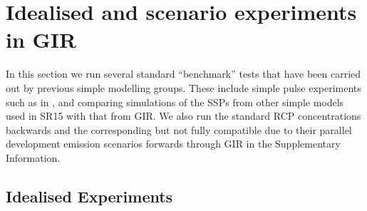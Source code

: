 \documentclass[gmd, manuscript]{copernicus}
\begin{document}
\section{Idealised and scenario experiments in GIR}
In this section we run several standard ``benchmark'' tests that have been carried out by previous simple modelling groups. These include simple pulse experiments such as in \cite{Joos2013}, and comparing simulations of the SSPs \citep{Riahi2017} from other simple models used in SR15 \citep{Huppmann:2018:scenario-data,IPCC2018} with that from GIR. We also run the standard RCP concentrations backwards and the corresponding but not fully compatible due to their parallel development \citep{Moss2010} emission scenarios forwards through GIR in the Supplementary Information.
\subsection*{Idealised Experiments}
\end{document}
